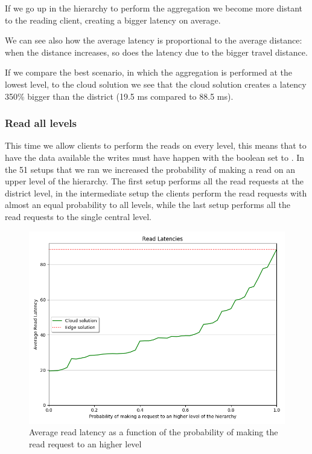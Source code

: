 If we go up in the hierarchy to perform the aggregation we become more distant to the reading client, creating a bigger latency on average.

We can see also how the average latency is proportional to the average distance: when the distance increases, so does the latency due to the bigger travel distance.

If we compare the best scenario, in which the aggregation is performed at the lowest level, to the cloud solution we see that the cloud solution creates a latency 350\% bigger than the district (19.5 ms compared to 88.5 ms). 


\subsubsection{Read all levels}
This time we allow clients to perform the reads on every level, this means that to have the data available the writes must have happen with the  boolean set to .
In the 51 setups that we ran we increased the probability of making a read on an upper level of the hierarchy. The first setup performs all the read requests at the district level, in the intermediate setup the clients perform the read requests with almost an equal probability to all levels, while the last setup performs all the read requests to the single central level.

\begin{figure}[H]
    \centering
    \includegraphics[width=0.86\linewidth]{Figures/Evaluation/read-all-latency.png}
    \caption{Average read latency as a function of the probability of making the read request to an higher level}
    \label{fig:/read-all-latency}
\end{figure}

